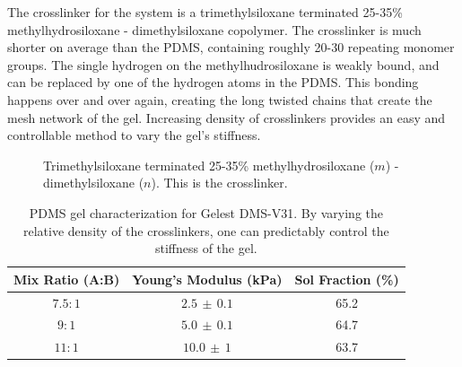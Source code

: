 The crosslinker for the system is a trimethylsiloxane terminated 25-35\% methylhydrosiloxane - dimethylsiloxane copolymer. The crosslinker is much shorter on average than the PDMS, containing roughly 20-30 repeating monomer groups. The single hydrogen on the methylhudrosiloxane is weakly bound, and can be replaced by one of the hydrogen atoms in the PDMS. This bonding happens over and over again, creating the long twisted chains that create the mesh network of the gel. Increasing density of crosslinkers provides an easy and controllable method to vary the gel's stiffness.

\begin{figure}
	\centering
	\label{fig:HMS-301}
	\caption[HMS-301]{Trimethylsiloxane terminated 25-35\% methylhydrosiloxane ($m$) - dimethylsiloxane ($n$). This is the crosslinker.}
\end{figure}

\begin{table}[h!]
	\begin{center}
		\begin{tabular}{|c||c||c|}
			\hline
			Mix Ratio (A:B) & Young's Modulus (kPa) & Sol Fraction (\%)\\
			\hline
			$7.5:1$ & $2.5 \,\pm\, 0.1$ & 65.2\\
			\hline
			$9:1$ & $5.0 \, \pm\, 0.1$  & 64.7\\
			\hline
			$11:1$ & $10.0 \,\pm\, 1$  & 63.7\\
			\hline
		\end{tabular}
	\end{center}
	\label{tab:recipes}
	\caption[PDMS ratios Characterization]{PDMS gel characterization for Gelest DMS-V31. By varying the relative density of the crosslinkers, one can predictably control the stiffness of the gel.}
\end{table}




